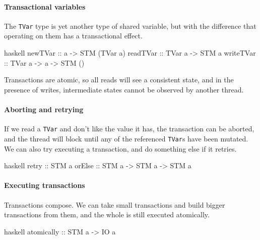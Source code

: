 \paragraph{Transactional variables}
The \verb|TVar| type is yet another type of shared variable, but with
the difference that operating on them has a transactional effect.

\begin{listing}
\centering
\begin{cminted}{haskell}
newTVar   :: a -> STM (TVar a)
readTVar  :: TVar a -> STM a
writeTVar :: TVar a -> a -> STM ()
\end{cminted}
\caption{Transactional variables in Haskell.}\label{lst:tvars_haskell}
\end{listing}

Transactions are atomic, so all reads will see a consistent state, and
in the presence of writes, intermediate states cannot be observed by
another thread.

\paragraph{Aborting and retrying}
If we read a \verb|TVar| and don't like the value it has, the
transaction can be aborted, and the thread will block until any of the
referenced \verb|TVar|s have been mutated.  We can also try executing
a transaction, and do something else if it retries.

\begin{listing}
\centering
\begin{cminted}{haskell}
retry  :: STM a
orElse :: STM a -> STM a -> STM a
\end{cminted}
\caption{Aborting and retrying transactions in Haskell.}\label{lst:orelse_haskell}
\end{listing}

\paragraph{Executing transactions}
Transactions compose.  We can take small transactions and build bigger
transactions from them, and the whole is still executed atomically.

\begin{listing}
\centering
\begin{cminted}{haskell}
atomically :: STM a -> IO a
\end{cminted}
\caption{Executing transactions in Haskell}\label{lst:atomically_haskell}
\end{listing}

